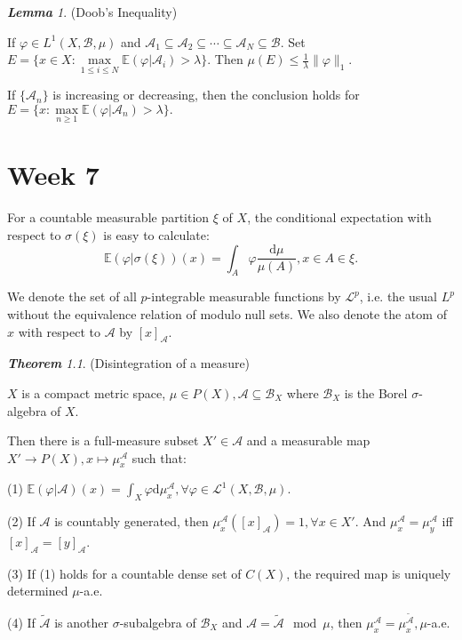 \documentclass[10pt, a4paper, oneside]{report}
\numberwithin{equation}{chapter}
\theoremstyle{remark}
\newtheorem{theorem}[definition]{\bf{Theorem}}
\newtheorem{lemma}[definition]{\bf{Lemma}}
\theoremstyle{remark}
\begin{document}
\begin{lemma}
    (Doob's Inequality)

    If $\varphi\in L^1(X,\mathcal{B},\mu)$ and $\mathcal{A}_1\subseteq \mathcal{A}_2\subseteq\cdots\subseteq\mathcal{A}_N\subseteq\mathcal{B}$. Set $E=\{x\in X:\max\limits_{1\leqslant i\leqslant N}\mathbb{E}(\varphi|\mathcal{A}_i)>\lambda\}$.
    Then $\mu(E)\leqslant\frac{1}{\lambda}\|\varphi\|_1.$

    If $\{\mathcal{A}_n\}$ is increasing or decreasing, then the conclusion holds for $E=\{x:\max\limits_{n\geqslant 1}\mathbb{E}(\varphi|\mathcal{A}_n)>\lambda\}.$
\end{lemma}

\chapter{Week 7}
For a countable measurable partition $\xi$ of $X$, the conditional expectation with respect to $\sigma(\xi)$ is easy to calculate:
$$\mathbb{E}(\varphi|\sigma(\xi))(x)=\int_A\varphi\frac{\mathrm{d}\mu}{\mu(A)},x\in A\in \xi.$$

We denote the set of all $p$-integrable measurable functions by $\mathcal{L}^p$, i.e. the usual $L^p$ without the equivalence relation of modulo null sets. We also denote the atom of $x$ with respect to $\mathcal{A}$ by $[x]_\mathcal{A}.$

\begin{theorem}
(Disintegration of a measure)

    $X$ is a compact metric space, $\mu\in P(X),\mathcal{A}\subseteq\mathcal{B}_X$ where $\mathcal{B}_X$ is the Borel $\sigma$-algebra of $X$.

    Then there is a full-measure subset $X'\in\mathcal{A}$ and a measurable map $X'\rightarrow P(X),x\mapsto \mu_x^\mathcal{A}$ such that:

    (1) $\mathbb{E}(\varphi|\mathcal{A})(x)=\int_X\varphi\mathrm{d}\mu_x^\mathcal{A},\forall \varphi\in \mathcal{L}^1(X,\mathcal{B},\mu)$.

    (2) If $\mathcal{A}$ is countably generated, then $\mu_x^\mathcal{A}([x]_\mathcal{A})=1,\forall x\in X'$. And $\mu_x^\mathcal{A}=\mu_y^\mathcal{A}$ iff $[x]_\mathcal{A}=[y]_\mathcal{A}$.

    (3) If (1) holds for a countable dense set of $C(X)$, the required map is uniquely determined $\mu$-a.e.

    (4) If $\tilde{\mathcal{A}}$ is another $\sigma$-subalgebra of $\mathcal{B}_X$ and $\mathcal{A}=\tilde{\mathcal{A}}\mod\mu$, then $\mu_x^\mathcal{A}=\mu_x^{\tilde{\mathcal{A}}},\mu$-a.e.
\end{theorem}
\end{document}
